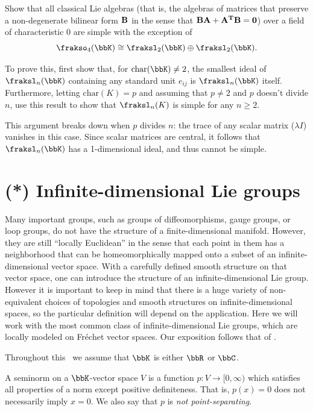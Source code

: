 \begin{xca}
    Show that all classical Lie algebras (that is, the algebras of matrices that preserve a non-degenerate bilinear form $\bf{B}$ in the sense that $\bf{B}A+A^T\bf{B}=0$) over a field of characteristic 0 are simple with the exception of
    \[\frakso_4(\bbK)\cong \fraksl_2(\bbK)\oplus\fraksl_2(\bbK).\]

    To prove this, first show that, for $\mathrm{char}(\bbK)\neq 2$, the smallest ideal of $\fraksl_n(\bbK)$ containing any standard unit $e_{ij}$ is $\fraksl_n(\bbK)$ itself. Furthermore, letting $\mathrm{char}(K)=p$ and assuming that $p\neq 2$ and $p$ doesn't divide $n$, use this result to show that $\fraksl_n(K)$ is simple for any $n\geq 2$. 

    This argument breaks down when $p$ divides $n$: the trace of any scalar matrix ($\lambda I$) vanishes in this case. Since scalar matrices are central, it follows that $\fraksl_n(\bbK)$ has a 1-dimensional ideal, and thus cannot be simple.
\end{xca}






\section{(*) Infinite-dimensional Lie groups}\label{sec: inf-dim groups}


Many important groups, such as groups of diffeomorphisms, gauge groups, or loop groups, do not have the structure of a finite-dimensional manifold. However, they are still ``locally Euclidean'' in the sense that each point in them has a neighborhood that can be homeomorphically mapped onto a subset of an infinite-dimensional vector space. With a carefully defined smooth structure on that vector space, one can introduce the structure of an infinite-dimensional Lie group. However it is important to keep in mind that there is a huge variety of non-equivalent choices of topologies and smooth structures on infinite-dimensional spaces, so the particular definition will depend on the application. Here we will work with the most common class of infinite-dimensional Lie groups, which are locally modeled on Fr\'echet vector spaces. Our exposition follows that of \cite{Neeb}.

Throughout this \sect\  we assume that $\bbK$ is either $\bbR$ or $\bbC$.

\begin{defn}[Seminorm]
    A seminorm on a $\bbK$-vector space $V$ is a function $p:V\to [0,\infty)$ which satisfies all properties of a norm except positive definiteness. That is, $p(x)=0$ does not necessarily imply $x=0$. We also say that $p$ is \emph{not point-separating}.
\end{defn}

